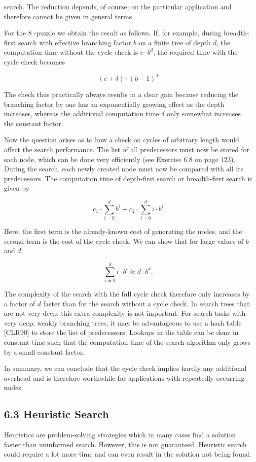 \documentclass[10pt]{article}
\begin{document}
search. The reduction depends, of course, on the particular application and therefore cannot be given in general terms.

For the 8 -puzzle we obtain the result as follows. If, for example, during breadth-first search with effective branching factor $b$ on a finite tree of depth $d$, the computation time without the cycle check is $c \cdot b^{d}$, the required time with the cycle check becomes

$$
(c+\delta) \cdot(b-1)^{d}
$$

The check thus practically always results in a clear gain because reducing the branching factor by one has an exponentially growing effect as the depth increases, whereas the additional computation time $\delta$ only somewhat increases the constant factor.

Now the question arises as to how a check on cycles of arbitrary length would affect the search performance. The list of all predecessors must now be stored for each node, which can be done very efficiently (see Exercise 6.8 on page 123). During the search, each newly created node must now be compared with all its predecessors. The computation time of depth-first search or breadth-first search is given by

$$
c_{1} \cdot \sum_{i=0}^{d} b^{i}+c_{2} \cdot \sum_{i=0}^{d} i \cdot b^{i}
$$

Here, the first term is the already-known cost of generating the nodes, and the second term is the cost of the cycle check. We can show that for large values of $b$ and $d$,

$$
\sum_{i=0}^{d} i \cdot b^{i} \approx d \cdot b^{d} .
$$

The complexity of the search with the full cycle check therefore only increases by a factor of $d$ faster than for the search without a cycle check. In search trees that are not very deep, this extra complexity is not important. For search tasks with very deep, weakly branching trees, it may be advantageous to use a hash table [CLR90] to store the list of predecessors. Lookups in the table can be done in constant time such that the computation time of the search algorithm only grows by a small constant factor.

In summary, we can conclude that the cycle check implies hardly any additional overhead and is therefore worthwhile for applications with repeatedly occurring nodes.

\subsection*{6.3 Heuristic Search}
Heuristics are problem-solving strategies which in many cases find a solution faster than uninformed search. However, this is not guaranteed. Heuristic search could require a lot more time and can even result in the solution not being found.
\end{document}
